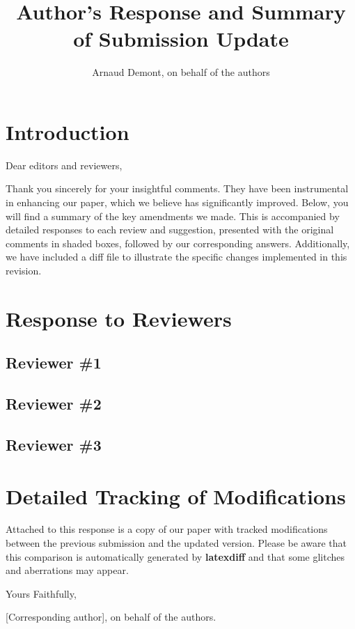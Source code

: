 \documentclass{article}
\newcounter{revquotecounter}
\newcommand{\resetrevquotecounter}{\setcounter{revquotecounter}{0}}
\begin{document}
\title{Author's Response and Summary of Submission Update}
\author{Arnaud Demont, on behalf of the authors}

\maketitle

\tableofcontents{}

\section{Introduction}

Dear editors and reviewers,

Thank you sincerely for your insightful comments. They have been instrumental in enhancing our paper, which we believe has significantly improved. Below, you will find a summary of the key amendments we made. This is accompanied by detailed responses to each review and suggestion, presented with the original comments in shaded boxes, followed by our corresponding answers. Additionally, we have included a diff file to illustrate the specific changes implemented in this revision.


\section{Response to Reviewers}

\subsection{Reviewer \#1}
\resetrevquotecounter


\subsection{Reviewer \#2}
\resetrevquotecounter


\subsection{Reviewer \#3}
\resetrevquotecounter



\section{Detailed Tracking of Modifications}

Attached to this response is a copy of our paper with tracked modifications between the previous submission and the updated version. Please be aware that this comparison is automatically generated by {\bf latexdiff} and that some glitches and aberrations may appear.

Yours Faithfully,

[Corresponding author], on behalf of the authors.

% 

\vfill
\end{document}

